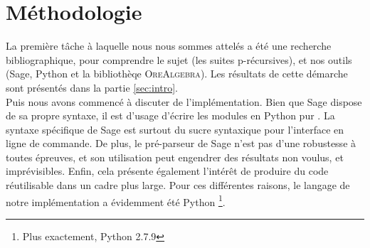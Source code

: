 \documentclass[12pt]{article}
\newlength{\charwidth}
\newcommand{\uline}{\underline{\hspace{2\charwidth}}}
\begin{document}

\section{Méthodologie}
    \label{sec:methodo}
    \par La première tâche à laquelle nous nous sommes attelés a été une recherche bibliographique,
    pour comprendre le sujet (les suites p-récursives), et nos outils (Sage, Python et la 
    bibliothèqe \textsc{OreAlgebra}).
    Les résultats de cette démarche sont présentés dans la partie \ref{sec:intro}.\\
    Puis nous avons commencé à discuter de l'implémentation. Bien que Sage dispose de sa propre
    syntaxe, il est d'usage d'écrire les modules en \og Python pur \fg. La syntaxe spécifique
    de Sage est surtout du sucre syntaxique pour l'interface en ligne de
    commande. De plus, le pré-parseur de Sage n'est pas d'une robustesse à toutes épreuves,
    et son utilisation peut engendrer des résultats non voulus, et imprévisibles. Enfin, 
    cela présente également l'intérêt de produire du code réutilisable dans un cadre plus large.
    Pour ces différentes raisons, le langage de notre implémentation a évidemment été Python
    \footnote{Plus exactement, Python 2.7.9}.
\end{document}
